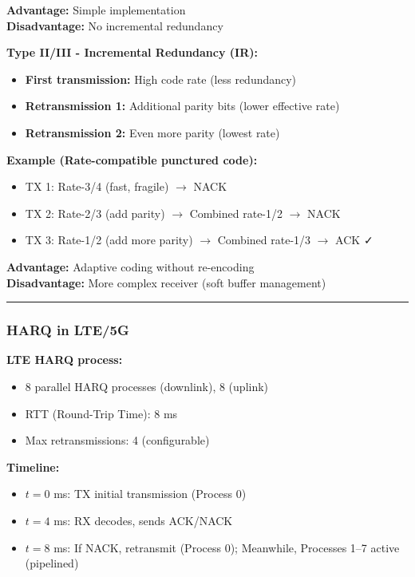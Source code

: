 \textbf{Advantage:} Simple implementation\\
\textbf{Disadvantage:} No incremental redundancy

\textbf{Type II/III - Incremental Redundancy (IR):}
\begin{itemize}
\item \textbf{First transmission:} High code rate (less redundancy)
\item \textbf{Retransmission 1:} Additional parity bits (lower effective rate)
\item \textbf{Retransmission 2:} Even more parity (lowest rate)
\end{itemize}

\textbf{Example (Rate-compatible punctured code):}
\begin{itemize}
\item TX 1: Rate-3/4 (fast, fragile) $\rightarrow$ NACK
\item TX 2: Rate-2/3 (add parity) $\rightarrow$ Combined rate-1/2 $\rightarrow$ NACK
\item TX 3: Rate-1/2 (add more parity) $\rightarrow$ Combined rate-1/3 $\rightarrow$ ACK ✓
\end{itemize}

\textbf{Advantage:} Adaptive coding without re-encoding\\
\textbf{Disadvantage:} More complex receiver (soft buffer management)

\begin{center}\rule{0.5\linewidth}{0.5pt}\end{center}

\subsubsection{HARQ in LTE/5G}\label{harq-in-lte5g}

\textbf{LTE HARQ process:}
\begin{itemize}
\item 8 parallel HARQ processes (downlink), 8 (uplink)
\item RTT (Round-Trip Time): 8 ms
\item Max retransmissions: 4 (configurable)
\end{itemize}

\textbf{Timeline:}
\begin{itemize}
\item $t = 0$ ms: TX initial transmission (Process 0)
\item $t = 4$ ms: RX decodes, sends ACK/NACK
\item $t = 8$ ms: If NACK, retransmit (Process 0); Meanwhile, Processes 1--7 active (pipelined)
\end{itemize}

